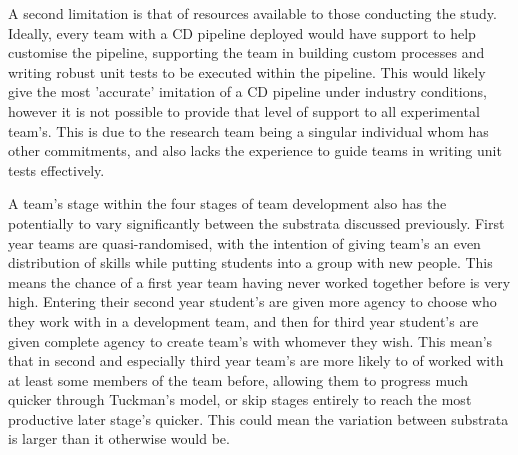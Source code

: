 \documentclass[journal]{IEEEtran}
\begin{document}
A second limitation is that of resources available to those conducting the study. Ideally, every team with a CD pipeline deployed would have support to help customise the pipeline, supporting the team in building custom processes and writing robust unit tests to be executed within the pipeline. This would likely give the most 'accurate' imitation of a CD pipeline under industry conditions, however it is not possible to provide that level of support to all experimental team's. This is due to the research team being a singular individual whom has other commitments, and also lacks the experience to guide teams in writing unit tests effectively.

A team's stage within the four stages of team development\cite{tuckman1965developmental} also has the potentially to vary significantly between the substrata discussed previously. First year teams are quasi-randomised, with the intention of giving team's an even distribution of skills while putting students into a group with new people. This means the chance of a first year team having never worked together before is very high. Entering their second year student's are given more agency to choose who they work with in a development team, and then for third year student's are given complete agency to create team's with whomever they wish. This mean's that in second and especially third year team's are more likely to of worked with at least some members of the team before, allowing them to progress much quicker through Tuckman's model, or skip stages entirely to reach the most productive later stage's quicker. This could mean the variation between substrata is larger than it otherwise would be.
\end{document}
